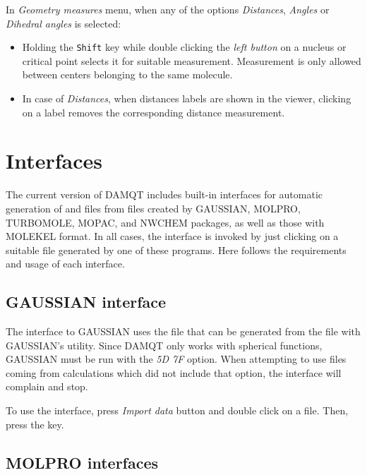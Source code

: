 \documentclass[10pt]{article}
\begin{document}
In {\it Geometry measures} menu, when any of the options 
{\it Distances}, {\it Angles}  or {\it Dihedral angles} 
is selected:

\begin{itemize}
\item Holding the \texttt{Shift} key while double clicking the {\it left button}
on a 
nucleus or critical point selects it for suitable measurement. 
Measurement is only allowed between centers belonging to the same molecule.
\item In case of {\it Distances}, when distances labels are shown in the viewer,
clicking on a label removes the corresponding distance measurement.
\end{itemize}

\newpage

\section{Interfaces \label{sec:Interfaces}}

The current version of DAMQT includes built-in interfaces for automatic
generation of \den{ } and \ggbs{ } files from files created by
GAUSSIAN, MOLPRO, TURBOMOLE, MOPAC, and NWCHEM packages, as well as those with MOLEKEL format. 
In all cases, the
interface is invoked by just clicking on a suitable file generated by one of
these programs. Here follows the requirements and usage of each interface.

\subsection{GAUSSIAN interface \label{sec:5.1}}

The interface to GAUSSIAN uses the \fchk{ } file that can be generated from 
the \chk{ } file with GAUSSIAN's \formchk{ } utility.
Since DAMQT only works with spherical functions, GAUSSIAN must be run with
the {\it 5D 7F} option. When attempting to use files coming from calculations
which did not include that option, the interface will complain and stop.

To use the interface, press {\it Import data} button \teclapuntos and double click
on a \fchk{ } file. Then, press the \exec key.

\subsection{MOLPRO interfaces \label{sec:5.2}}
\end{document}
